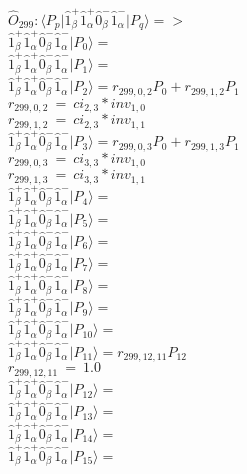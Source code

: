 \documentclass[14pt]{article}
\begin{document}
    $\hat{O}_{299}:  \langle{P_p}\vert \hat{1}_{\beta}^{+}\hat{1}_{\alpha}^{+}\hat{0}_{\beta}^{-}\hat{1}_{\alpha}^{-} \vert{P_q}\rangle => $ \\ 
    $ \hat{1}_{\beta}^{+}\hat{1}_{\alpha}^{+}\hat{0}_{\beta}^{-}\hat{1}_{\alpha}^{-} \vert{P_{0}}\rangle =  $ \\ 
    $ \hat{1}_{\beta}^{+}\hat{1}_{\alpha}^{+}\hat{0}_{\beta}^{-}\hat{1}_{\alpha}^{-} \vert{P_{1}}\rangle =  $ \\ 
    $ \hat{1}_{\beta}^{+}\hat{1}_{\alpha}^{+}\hat{0}_{\beta}^{-}\hat{1}_{\alpha}^{-} \vert{P_{2}}\rangle = {r}_{299,0,2}P_{0}+{r}_{299,1,2}P_{1} $ \\ 
    ${r}_{299,0,2}\ =\ {ci}_{2,3}*{inv}_{1,0} $ \\ 
    ${r}_{299,1,2}\ =\ {ci}_{2,3}*{inv}_{1,1} $ \\ 
    $ \hat{1}_{\beta}^{+}\hat{1}_{\alpha}^{+}\hat{0}_{\beta}^{-}\hat{1}_{\alpha}^{-} \vert{P_{3}}\rangle = {r}_{299,0,3}P_{0}+{r}_{299,1,3}P_{1} $ \\ 
    ${r}_{299,0,3}\ =\ {ci}_{3,3}*{inv}_{1,0} $ \\ 
    ${r}_{299,1,3}\ =\ {ci}_{3,3}*{inv}_{1,1} $ \\ 
    $ \hat{1}_{\beta}^{+}\hat{1}_{\alpha}^{+}\hat{0}_{\beta}^{-}\hat{1}_{\alpha}^{-} \vert{P_{4}}\rangle =  $ \\ 
    $ \hat{1}_{\beta}^{+}\hat{1}_{\alpha}^{+}\hat{0}_{\beta}^{-}\hat{1}_{\alpha}^{-} \vert{P_{5}}\rangle =  $ \\ 
    $ \hat{1}_{\beta}^{+}\hat{1}_{\alpha}^{+}\hat{0}_{\beta}^{-}\hat{1}_{\alpha}^{-} \vert{P_{6}}\rangle =  $ \\ 
    $ \hat{1}_{\beta}^{+}\hat{1}_{\alpha}^{+}\hat{0}_{\beta}^{-}\hat{1}_{\alpha}^{-} \vert{P_{7}}\rangle =  $ \\ 
    $ \hat{1}_{\beta}^{+}\hat{1}_{\alpha}^{+}\hat{0}_{\beta}^{-}\hat{1}_{\alpha}^{-} \vert{P_{8}}\rangle =  $ \\ 
    $ \hat{1}_{\beta}^{+}\hat{1}_{\alpha}^{+}\hat{0}_{\beta}^{-}\hat{1}_{\alpha}^{-} \vert{P_{9}}\rangle =  $ \\ 
    $ \hat{1}_{\beta}^{+}\hat{1}_{\alpha}^{+}\hat{0}_{\beta}^{-}\hat{1}_{\alpha}^{-} \vert{P_{10}}\rangle =  $ \\ 
    $ \hat{1}_{\beta}^{+}\hat{1}_{\alpha}^{+}\hat{0}_{\beta}^{-}\hat{1}_{\alpha}^{-} \vert{P_{11}}\rangle = {r}_{299,12,11}P_{12} $ \\ 
    ${r}_{299,12,11}\ =\ 1.0 $ \\ 
    $ \hat{1}_{\beta}^{+}\hat{1}_{\alpha}^{+}\hat{0}_{\beta}^{-}\hat{1}_{\alpha}^{-} \vert{P_{12}}\rangle =  $ \\ 
    $ \hat{1}_{\beta}^{+}\hat{1}_{\alpha}^{+}\hat{0}_{\beta}^{-}\hat{1}_{\alpha}^{-} \vert{P_{13}}\rangle =  $ \\ 
    $ \hat{1}_{\beta}^{+}\hat{1}_{\alpha}^{+}\hat{0}_{\beta}^{-}\hat{1}_{\alpha}^{-} \vert{P_{14}}\rangle =  $ \\ 
    $ \hat{1}_{\beta}^{+}\hat{1}_{\alpha}^{+}\hat{0}_{\beta}^{-}\hat{1}_{\alpha}^{-} \vert{P_{15}}\rangle =  $ \\ 
    
\end{document}
